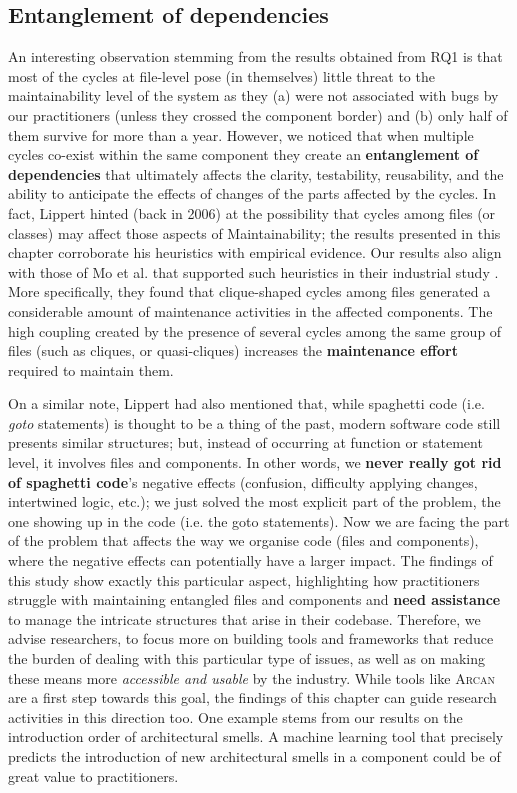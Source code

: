 \subsection{Entanglement of dependencies}
An interesting observation stemming from the results obtained from RQ1 is that most of the cycles at file-level pose (in themselves) little threat to the maintainability level of the system as they (a) were not associated with bugs by our practitioners (unless they crossed the component border) and (b) only half of them survive for more than a year.
However, we noticed that when multiple cycles co-exist within the same component they create an  \textbf{entanglement of dependencies} that ultimately affects the clarity, testability, reusability, and the ability to anticipate the effects of changes of the parts affected by the cycles.
In fact, Lippert \cite{Lippert2006} hinted (back in 2006) at the possibility that cycles among files (or classes) may affect those aspects of Maintainability; the results presented in this chapter corroborate his heuristics with empirical evidence.
Our results also align with those of Mo et al. that supported such heuristics in their industrial study \cite{Mo2018}.
More specifically, they found that clique-shaped cycles among files generated a considerable amount of maintenance activities in the affected components. 
The high coupling created by the presence of several cycles among the same group of files (such as cliques, or quasi-cliques) increases the \textbf{maintenance effort} required to maintain them.

On a similar note, Lippert had also mentioned that, while spaghetti code (i.e. \emph{goto} statements) is thought to be a thing of the past, modern software code still presents similar structures; but, instead of occurring at function or statement level, it involves files and components.
In other words, we \textbf{never really got rid of spaghetti code}'s negative effects (confusion, difficulty applying changes, intertwined logic, etc.); we just solved the most explicit part of the problem, the one showing up in the code (i.e. the goto statements). 
Now we are facing the part of the problem that affects the way we organise code (files and components), where the negative effects can potentially have a larger impact.
The findings of this study show exactly this particular aspect, highlighting how practitioners struggle with maintaining entangled files and components and \textbf{need assistance} to manage the intricate structures that arise in their codebase.
Therefore, we advise researchers, to focus more on building tools and frameworks that reduce the burden of dealing with this particular type of issues, as well as on making these means more \emph{accessible and usable} by the industry.
While tools like \textsc{Arcan} are a first step towards this goal, the findings of this chapter can  guide research activities in this direction too.
One example stems from our results on the introduction order of architectural smells. A machine learning tool that precisely predicts the introduction of new architectural smells in a component could be of great value to practitioners.

